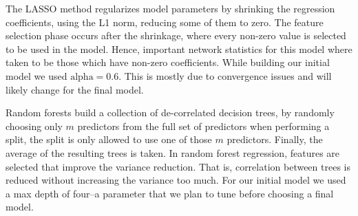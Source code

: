 \documentclass[12pt]{article}
\begin{document}
The LASSO method regularizes model parameters by shrinking the regression coefficients, using the L1 norm, reducing some of them to zero. The feature selection phase occurs after the shrinkage, where every non-zero value is selected to be used in the model. Hence, important network statistics for this model where taken to be those which have non-zero coefficients. While building our initial model we used $\text{alpha} = 0.6$. This is mostly due to convergence issues and will likely change for the final model.

Random forests build a collection of de-correlated decision trees, by randomly choosing only $m$ predictors from the full set of predictors when performing a split, the split is only allowed to use one of those $m$ predictors. Finally, the average of the resulting trees is taken. In random forest regression, features are selected that improve the variance reduction. That is, correlation between trees is reduced without increasing the variance too much. For our initial model we used a max depth of four--a parameter that we plan to tune before choosing a final model.
\end{document}
